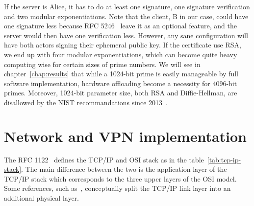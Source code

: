 If the server is Alice, it has to do at least one signature, one signature verification and two modular exponentiations.
Note that the client, B in our case, could have one signature less because RFC 5246~\cite{rfc5246} leave it as an optional feature, and the server would then have one verification less.
However, any sane configuration will have both actors signing their ephemeral public key.
If the certificate use RSA, we end up with four modular exponentiations, which can become quite heavy computing wise for certain sizes of prime numbers.
We will see in chapter~\ref{chap:results} that while a 1024-bit prime is easily manageable by full software implementation, hardware offloading become a necessity for 4096-bit primes.
Moreover, 1024-bit parameter size, both RSA and Diffie-Hellman, are disallowed by the NIST recommandations since 2013~\cite{nist-sp800-131A}.












\section{Network and VPN implementation}\label{sec:theory-network}

The RFC 1122~\cite{rfc1122} defines the TCP/IP and OSI stack as in the table~\ref{tab:tcp-ip-stack}.
The main difference between the two is the application layer of the TCP/IP stack which corresponds to the three upper layers of the OSI model.
Some references, such as~\citet{tanenbaum2011}, conceptually split the TCP/IP link layer into an additional physical layer.

